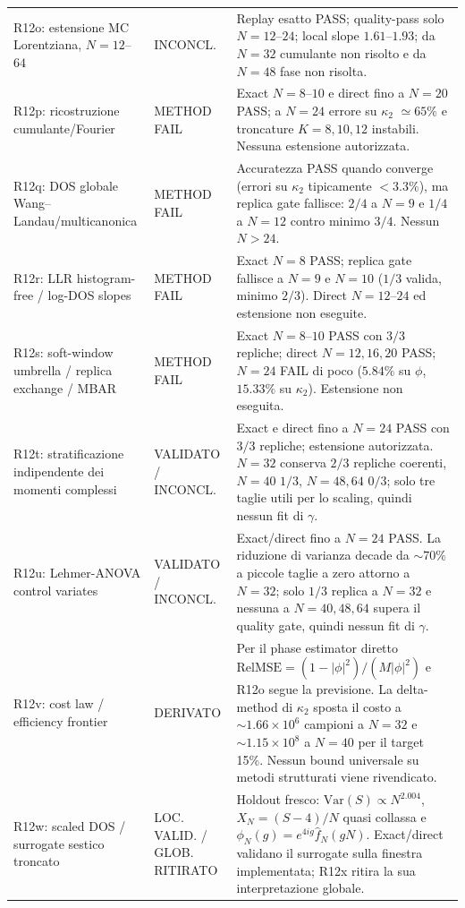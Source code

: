 \documentclass[11pt,a4paper]{article}
\newcommand{\status}[1]{\textsf{#1}}
\begin{document}
\begin{longtable}{p{}p{}p{}}
\addlinespace
R12o: estensione MC Lorentziana, $N=12$--$64$ & \status{INCONCL.} & Replay esatto PASS; quality-pass solo $N=12$--$24$; local slope $1.61$--$1.93$; da $N=32$ cumulante non risolto e da $N=48$ fase non risolta. \\
\addlinespace
R12p: ricostruzione cumulante/Fourier & \status{METHOD FAIL} & Exact $N=8$--$10$ e direct fino a $N=20$ PASS; a $N=24$ errore su $\kappa_2$ $\simeq65\%$ e troncature $K=8,10,12$ instabili. Nessuna estensione autorizzata. \\
\addlinespace
R12q: DOS globale Wang--Landau/multicanonica & \status{METHOD FAIL} & Accuratezza PASS quando converge (errori su $\kappa_2$ tipicamente $<3.3\%$), ma replica gate fallisce: $2/4$ a $N=9$ e $1/4$ a $N=12$ contro minimo $3/4$. Nessun $N>24$. \\
\addlinespace
R12r: LLR histogram-free / log-DOS slopes & \status{METHOD FAIL} & Exact $N=8$ PASS; replica gate fallisce a $N=9$ e $N=10$ ($1/3$ valida, minimo $2/3$). Direct $N=12$--$24$ ed estensione non eseguite. \\
R12s: soft-window umbrella / replica exchange / MBAR & \status{METHOD FAIL} & Exact $N=8$--$10$ PASS con $3/3$ repliche; direct $N=12,16,20$ PASS; $N=24$ FAIL di poco ($5.84\%$ su $\phi$, $15.33\%$ su $\kappa_2$). Estensione non eseguita. \\
\addlinespace
R12t: stratificazione indipendente dei momenti complessi & \status{VALIDATO / INCONCL.} & Exact e direct fino a $N=24$ PASS con $3/3$ repliche; estensione autorizzata. $N=32$ conserva $2/3$ repliche coerenti, $N=40$ $1/3$, $N=48,64$ $0/3$; solo tre taglie utili per lo scaling, quindi nessun fit di $\gamma$. \\
R12u: Lehmer-ANOVA control variates & \status{VALIDATO / INCONCL.} & Exact/direct fino a $N=24$ PASS. La riduzione di varianza decade da $\sim70\%$ a piccole taglie a zero attorno a $N=32$; solo $1/3$ replica a $N=32$ e nessuna a $N=40,48,64$ supera il quality gate, quindi nessun fit di $\gamma$. \\
\addlinespace
R12v: cost law / efficiency frontier & \status{DERIVATO} & Per il phase estimator diretto $\mathrm{RelMSE}=(1-|\phi|^2)/(M|\phi|^2)$ e R12o segue la previsione. La delta-method di $\kappa_2$ sposta il costo a $\sim1.66\times10^6$ campioni a $N=32$ e $\sim1.15\times10^8$ a $N=40$ per il target 15\%. Nessun bound universale su metodi strutturati viene rivendicato. \\
\addlinespace
R12w: scaled DOS / surrogate sestico troncato & \status{LOC. VALID. / GLOB. RITIRATO} & Holdout fresco: $\mathrm{Var}(S)\propto N^{2.004}$, $X_N=(S-4)/N$ quasi collassa e $\phi_N(g)=e^{4ig}\widehat f_N(gN)$. Exact/direct validano il surrogate sulla finestra implementata; R12x ritira la sua interpretazione globale. \\

\end{longtable}
\end{document}
